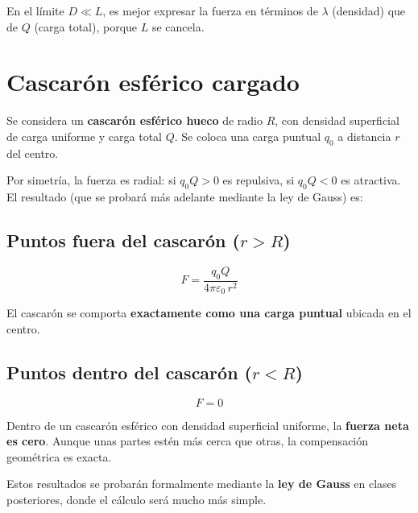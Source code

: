 \documentclass[12pt,a4paper]{article}
\begin{document}


\begin{warnbox}[Atención]
  En el límite $D \ll L$, es mejor expresar la fuerza en términos de
  $\lambda$ (densidad) que de $Q$ (carga total), porque $L$ se cancela.
\end{warnbox}

\section{Cascarón esférico cargado}

Se considera un \textbf{cascarón esférico hueco} de radio $R$, con
densidad superficial de carga uniforme y carga total $Q$. Se coloca una
carga puntual $q_0$ a distancia $r$ del centro.

Por simetría, la fuerza es radial: si $q_0 Q > 0$ es repulsiva, si
$q_0 Q < 0$ es atractiva. El resultado (que se probará más adelante
mediante la ley de Gauss) es:

\subsection{Puntos fuera del cascarón ($r > R$)}

\[
F = \frac{q_0 Q}{4\pi\varepsilon_0 \, r^{2}}
\]

El cascarón se comporta \textbf{exactamente como una carga puntual}
ubicada en el centro.

\subsection{Puntos dentro del cascarón ($r < R$)}

\[
F = 0
\]



\begin{keybox}
  Dentro de un cascarón esférico con densidad superficial uniforme, la
  \textbf{fuerza neta es cero}. Aunque unas partes estén más cerca que
  otras, la compensación geométrica es exacta.
\end{keybox}

\begin{notebox}
  Estos resultados se probarán formalmente mediante la \textbf{ley de
  Gauss} en clases posteriores, donde el cálculo será mucho más simple.
\end{notebox}
\end{document}
